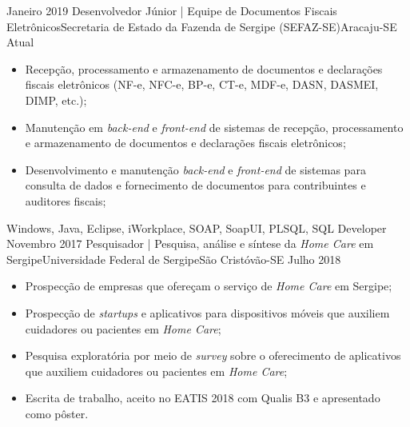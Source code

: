 \begin{experiences}
    \emptySeparator
    \experience
        {Janeiro 2019} {Desenvolvedor Júnior | Equipe de Documentos Fiscais Eletrônicos}{Secretaria de Estado da Fazenda de Sergipe (SEFAZ-SE)}{Aracaju-SE}
        {Atual} {
                    \begin{itemize}
                        \item Recepção, processamento e armazenamento de documentos e declarações fiscais eletrônicos (NF-e, NFC-e, BP-e, CT-e, MDF-e, DASN, DASMEI, DIMP, etc.);
                        \item Manutenção em \textit{back-end} e \textit{front-end} de sistemas de recepção, processamento e armazenamento de documentos e declarações fiscais eletrônicos;
                        \item Desenvolvimento  e manutenção \textit{back-end} e \textit{front-end} de sistemas para consulta de dados e fornecimento de documentos para contribuintes e auditores fiscais;
                    \end{itemize}
                }
                {Windows, Java, Eclipse, iWorkplace, SOAP, SoapUI, PLSQL, SQL Developer}
    \emptySeparator
    \experience
        {Novembro 2017} {Pesquisador | Pesquisa, análise e síntese da \textit{Home Care} em Sergipe}{Universidade Federal de Sergipe}{São Cristóvão-SE}
        {Julho 2018}    {
                          \begin{itemize}
                            \item Prospecção de empresas que ofereçam o serviço de \textit{Home Care} em Sergipe;
                            \item Prospecção de \textit{startups} e aplicativos para dispositivos móveis que auxiliem cuidadores ou pacientes em \textit{Home Care};
                            \item Pesquisa exploratória por meio de \textit{survey} sobre o oferecimento de aplicativos que auxiliem cuidadores ou pacientes em \textit{Home Care};
                            \item Escrita de trabalho, aceito no EATIS 2018 com Qualis B3 e apresentado como pôster.
                          \end{itemize}
                        }
                        {}

\end{experiences}
